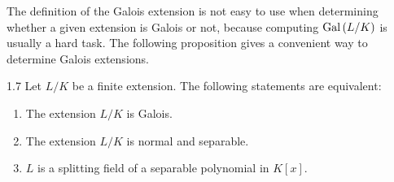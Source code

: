 \documentclass[twoside = false,	%
		headsepline,		%
		parskip = true,
		]{scrbook}						%
\begin{document}
        The definition of the Galois extension is not easy to use when determining whether a given extension is Galois or not, because computing $\mathrm{Gal}\left( L/K\right)$ is usually a hard task. The following proposition gives a convenient way to determine Galois extensions.

        \begin{proposition}{}{1.7}
        	Let $L/K$ be a finite extension. The following statements are equivalent:
        	\begin{enumerate}
        		\item The extension $L/K$ is Galois.
        		\item The extension $L/K$ is normal and separable.
        		\item $L$ is a splitting field of a separable polynomial in $K[x]$.
        	\end{enumerate}
        \end{proposition}
\end{document}
